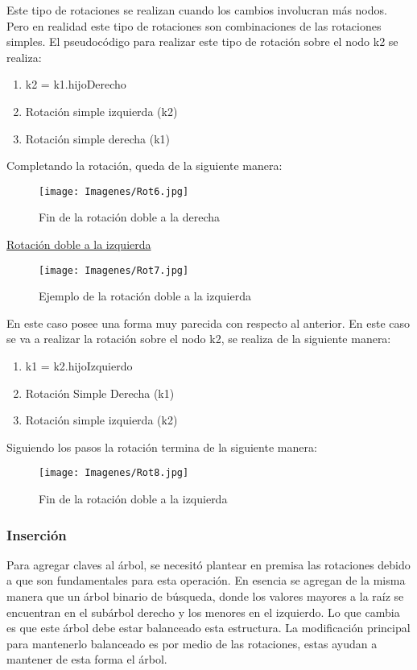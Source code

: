 \documentclass[12pt]{article}
\begin{document}
Este tipo de rotaciones se realizan cuando los cambios involucran más nodos. Pero en realidad este tipo de rotaciones son combinaciones de las rotaciones simples. El pseudocódigo para realizar este tipo de rotación sobre el nodo k2 se realiza:

\begin{enumerate}
    \item k2 = k1.hijoDerecho
    \item Rotación simple izquierda (k2)
    \item Rotación simple derecha (k1)
\end{enumerate}

Completando la rotación, queda de la siguiente manera:

\begin{figure}[H]
   \centering
   \texttt{[image: Imagenes/Rot6.jpg]}
   \caption{Fin de la rotación doble a la derecha}
   \label{imagen6}
\end{figure}

\underline{Rotación doble a la izquierda}

\begin{figure}[H]
   \centering
   \texttt{[image: Imagenes/Rot7.jpg]}
   \caption{Ejemplo de la rotación doble a la izquierda}
   \label{imagen7}
\end{figure}

En este caso posee una forma muy parecida con respecto al anterior. En este caso se va a realizar la rotación sobre el nodo k2, se realiza de la siguiente manera:

\begin{enumerate}
    \item k1 = k2.hijoIzquierdo
    \item Rotación Simple Derecha (k1)
    \item Rotación simple izquierda (k2)
\end{enumerate}

Siguiendo los pasos la rotación termina de la siguiente manera:

\begin{figure}[H]
   \centering
   \texttt{[image: Imagenes/Rot8.jpg]}
   \caption{Fin de la rotación doble a la izquierda}
   \label{imagen8}
\end{figure}

\subsubsection{Inserción}
Para agregar claves al árbol, se necesitó plantear en premisa las rotaciones debido a que son fundamentales para esta operación. En esencia se agregan de la misma manera que un árbol binario de búsqueda, donde los valores mayores a la raíz se encuentran en el subárbol derecho y los menores en el izquierdo. Lo que cambia es que este árbol debe estar balanceado esta estructura. La modificación principal para mantenerlo balanceado es por medio de las rotaciones, estas ayudan a mantener de esta forma el árbol.
\end{document}
